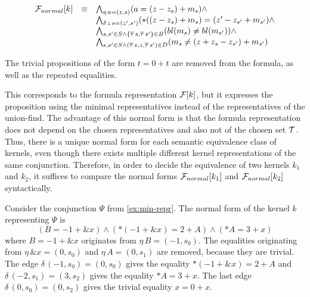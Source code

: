 \[
    \begin{array}{lll}
        \mathcal{F}_{normal}[k] & \equiv & \bigwedge_{\eta\,a=(z,s)} (a = (z - z_s) + m_s) \land                                                           \\
                         &        & \bigwedge_{\delta\,z\,s=(z',s')} (*((z-z_s) + m_s) = (z'-z_{s'} + m_{s'}) \land                                 \\
                         &        & \bigwedge_{s,s' \in S \land \{\overline{\tau}\,s, \overline{\tau}\,s'\} \in B} (bl(m_{s}) \neq bl(m_{s'})) \land           \\
                         &        & \bigwedge_{s,s' \in S \land (\overline{\tau}\,s, z,\overline{\tau}\,s') \in D} (m_{s} \neq (z+ z_{s} -z_{s'}) + m_{s'})
    \end{array}
\]

The trivial propositions of the form $t = 0 + t$ are removed from the formula, as well as the repeated equalities.

This corresponds to the formula representation $\mathcal{F}[k]$, but it expresses the proposition using the minimal representatives instead of the representatives of the union-find.
The advantage of this normal form is that the formula representation does not depend on the chosen representatives and also not of the chosen set $\mathcal{T}$.
Thus, there is a unique normal form for each semantic equivalence class of kernels,
even though there exists multiple different kernel representations of the same conjunction.
Therefore, in order to decide the equivalence of two kernels $k_1$ and $k_2$, it suffices to compare the normal forms $\mathcal{F}_{normal}[k_1]$ and $\mathcal{F}_{normal}[k_2]$ syntactically.

\begin{example}
    Consider the conjunction $\Psi$ from \cref{ex:min-repr}.
    The normal form of the kernel $k$ representing $\Psi$ is
    \[
    (B = -1+\&x) \land (*(-1 + \&x) = 2 + A) \land (*A = 3 + x)
    \]
    where $B = -1 + \&x$ originates from $\eta\,B = (-1,s_0)$.
    The equalities originating from $\eta\,\&x = (0,s_0)$ and $\eta\,A = (0, s_1)$ are removed, because they are trivial.
    The edge $\delta\,(-1,s_0) = (0,s_0)$ gives the equality $*(-1 + \&x) = 2 + A$ and
    $\delta\,(-2,s_1) = (3,s_2)$ gives the equality $*A = 3 + x$.
    The last edge $\delta\,(0,s_0) = (0,s_2)$ gives the trivial equality $x = 0 + x$.
\end{example}



